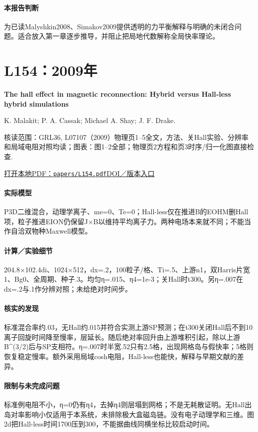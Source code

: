 \paragraph{本报告判断}为已读Malyshkin2008、Simakov2009提供透明的力平衡解释与明确的未闭合问题。适合放入第一章逐步推导，并阻止把局地代数解称全局快率理论。

\section{L154：2009年}\label{paper:L154}

\textbf{The hall effect in magnetic reconnection: Hybrid versus Hall‐less hybrid simulations}\citep{L154}\

K. Malakit;  P. A. Cassak;  Michael A. Shay;  J. F. Drake.

\textsf{核读范围：}GRL36, L07107（2009）物理页1–5全文，方法、关Hall实验、分辨率和局域电阻对照均读；\textsf{图表：}图1–2全部；物理页2方程和页3时序/归一化图直接检查.

\href{run:papers/L154.pdf}{打开本地PDF：\texttt{papers/L154.pdf}}\quad\href{https://doi.org/10.1029/2009gl037538}{DOI／版本入口}

\paragraph{实际模型}P3D二维混合，动理学离子、me=0、Te=0；Hall-less仅在推进B的EOHM删Hall项，粒子推进EION仍保留J×B以维持平均离子力。两种电场本来就不同；不能当作自洽双物种Maxwell模型。

\paragraph{计算／实验细节}204.8×102.4di、1024×512，dx=.2，100粒子/格、Ti=.5、上游n1，双Harris片宽1、Bg0、全周期、种子.3。均匀η=.015、η4=1e-3；关Hall时t300。另η=.007在dx=.2与.1作分辨对照；未给绝对时间步。

\paragraph{核实的发现}标准混合率约.03，无Hall约.015并符合实测上游SP预测；在t300关闭Hall后不到10离子回旋时间降至慢率，层延长。随后绝对率回升由上游堆积引起，除以上游B\textasciicircum{}(3/2)后与SP支相符。η=.007时半宽.52只有2.5格，出现网格岛与假快率；5格则恢复稳定慢率。额外采用局域cosh电阻，Hall-less也能快，解释与早期文献的差异。

\paragraph{限制与未完成问题}标准例电阻不小，η=0仍有η4，去掉η4则层塌到网格；不是无耗散证明。无Hall出岛对率影响小仅适用于本系统，未排除极大盒磁岛链。没有电子动理学和三维。图2d把Hall-less时间1700压到300，不能据曲线同横坐标比较启动时间。

